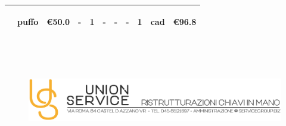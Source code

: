 \documentclass[a4paper]{article}
\begin{document}
\begin{tabular}{ | L{6.1mm} |  L{26mm} | L{11mm} |  L{9mm} | L{6.5mm} | L{6.5mm} | L{6.5mm} | L{6.5mm} | L{8mm} | L{7.7mm} | L{16mm} |  }
                        \vspace{2.5mm}\begin{spacing}{0}\end{spacing} &\vspace{2.5mm}\begin{spacing}{0}puffo\end{spacing} &\vspace{2.5mm}\begin{spacing}{0}\euro\hfill  50.0\end{spacing} &\vspace{2.5mm}\begin{spacing}{0}-\end{spacing} &\vspace{2.5mm}\begin{spacing}{0}1\end{spacing} &\vspace{2.5mm}\begin{spacing}{0}-\end{spacing} &\vspace{2.5mm}\begin{spacing}{0}-\end{spacing} &\vspace{2.5mm}\begin{spacing}{0}-\end{spacing} &\vspace{2.5mm}\begin{spacing}{0}1\end{spacing} &\vspace{2.5mm}\begin{spacing}{0}cad\end{spacing} &\vspace{2.5mm}\begin{spacing}{0}\euro\hfill  96.8
                        \end{spacing} \\ \hline %

                        \end{tabular} \\ \newpage
                                \begin{figure}[!t]
                                \includegraphics[width=15.8cm, height=3cm]{intestazioneAlta2.jpg}
                                \end{figure}
                                
\end{document}
